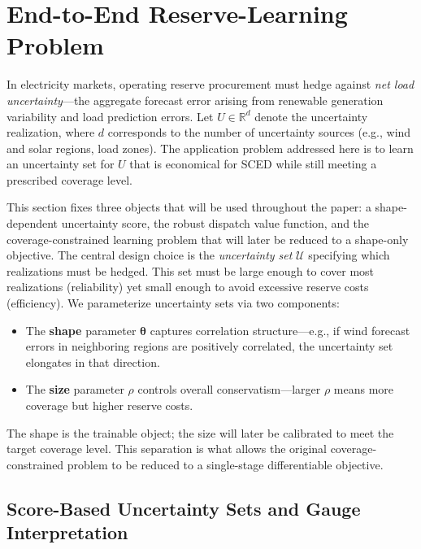 \documentclass[11pt]{article}
\newcommand{\R}{\mathbb{R}}
\newcommand{\cU}{\mathcal{U}}
\newcommand{\btheta}{\bm{\theta}}
\theoremstyle{definition}
\begin{document}
\section{End-to-End Reserve-Learning Problem}
\label{sec:formulation}

In electricity markets, operating reserve procurement must hedge against \emph{net load uncertainty}---the aggregate forecast error arising from renewable generation variability and load prediction errors. Let $U \in \R^d$ denote the uncertainty realization, where $d$ corresponds to the number of uncertainty sources (e.g., wind and solar regions, load zones). The application problem addressed here is to learn an uncertainty set for $U$ that is economical for SCED while still meeting a prescribed coverage level.

This section fixes three objects that will be used throughout the paper: a shape-dependent uncertainty score, the robust dispatch value function, and the coverage-constrained learning problem that will later be reduced to a shape-only objective. The central design choice is the \emph{uncertainty set} $\cU$ specifying which realizations must be hedged. This set must be large enough to cover most realizations (reliability) yet small enough to avoid excessive reserve costs (efficiency). We parameterize uncertainty sets via two components:
\begin{itemize}
\item The \textbf{shape} parameter $\btheta$ captures correlation structure---e.g., if wind forecast errors in neighboring regions are positively correlated, the uncertainty set elongates in that direction.
\item The \textbf{size} parameter $\rho$ controls overall conservatism---larger $\rho$ means more coverage but higher reserve costs.
\end{itemize}
The shape is the trainable object; the size will later be calibrated to meet the target coverage level. This separation is what allows the original coverage-constrained problem to be reduced to a single-stage differentiable objective.

\subsection{Score-Based Uncertainty Sets and Gauge Interpretation}
\end{document}
